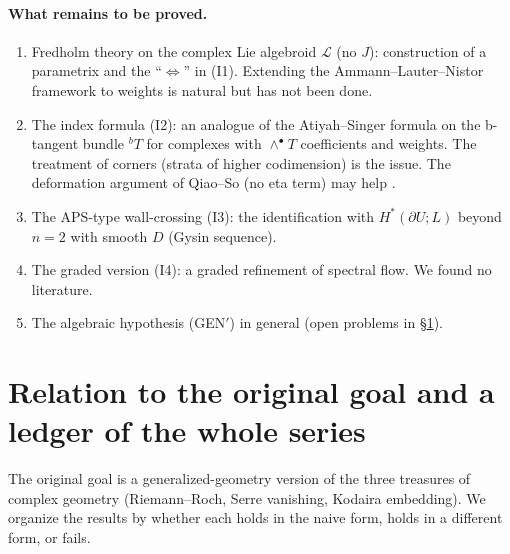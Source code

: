 \paragraph{What remains to be proved.}
\begin{enumerate}
\item Fredholm theory on the complex Lie algebroid $\mathcal L$ (no $J$): construction of a parametrix and the ``$\Leftrightarrow$'' in (I1). Extending the Ammann--Lauter--Nistor framework to weights is natural but has not been done.
\item The index formula (I2): an analogue of the Atiyah--Singer formula on the b-tangent bundle $^bT$ \cite{BLS} for complexes with $\wedge^\bullet T$ coefficients and weights. The treatment of corners (strata of higher codimension) is the issue. The deformation argument of Qiao--So (no eta term) may help \tQ.
\item The APS-type wall-crossing (I3): the identification with $H^*(\partial U;L)$ beyond $n=2$ with smooth $D$ (Gysin sequence).
\item The graded version (I4): a graded refinement of spectral flow. We found no literature.
\item The algebraic hypothesis (GEN$'$) in general (open problems in \S\ref{p5:sec:ledger}).
\end{enumerate}

\section{Relation to the original goal and a ledger of the whole series}\label{p5:sec:ledger}
The original goal is a generalized-geometry version of the three treasures of complex geometry (Riemann--Roch, Serre vanishing, Kodaira embedding). We organize the results by whether each holds in the naive form, holds in a different form, or fails.

